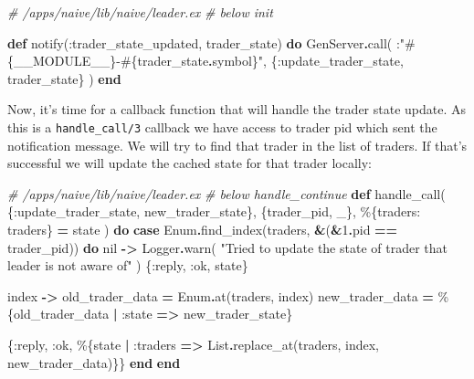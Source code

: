 \documentclass[
]{book}
\newenvironment{Shaded}{\begin{snugshade}}{\end{snugshade}}
\newcommand{\CommentTok}[1]{\textcolor[rgb]{0.56,0.35,0.01}{\textit{#1}}}
\newcommand{\ConstantTok}[1]{\textcolor[rgb]{0.00,0.00,0.00}{#1}}
\newcommand{\DecValTok}[1]{\textcolor[rgb]{0.00,0.00,0.81}{#1}}
\newcommand{\KeywordTok}[1]{\textcolor[rgb]{0.13,0.29,0.53}{\textbf{#1}}}
\newcommand{\NormalTok}[1]{#1}
\newcommand{\OperatorTok}[1]{\textcolor[rgb]{0.81,0.36,0.00}{\textbf{#1}}}
\newcommand{\OtherTok}[1]{\textcolor[rgb]{0.56,0.35,0.01}{#1}}
\newcommand{\StringTok}[1]{\textcolor[rgb]{0.31,0.60,0.02}{#1}}
\newcommand{\VariableTok}[1]{\textcolor[rgb]{0.00,0.00,0.00}{#1}}
\begin{document}
\begin{Shaded}
\begin{Highlighting}[]
  \CommentTok{\# /apps/naive/lib/naive/leader.ex}
  \CommentTok{\# below init}

  \KeywordTok{def}\NormalTok{ notify(}\VariableTok{:trader\_state\_updated}\NormalTok{, trader\_state) }\KeywordTok{do}
    \ConstantTok{GenServer}\OperatorTok{.}\NormalTok{call(}
\NormalTok{      :}\StringTok{"}\OtherTok{\#\{}\ConstantTok{\_\_MODULE\_\_}\OtherTok{\}}\StringTok{{-}}\OtherTok{\#\{}\NormalTok{trader\_state}\OperatorTok{.}\NormalTok{symbol}\OtherTok{\}}\StringTok{"}\NormalTok{,}
\NormalTok{      \{}\VariableTok{:update\_trader\_state}\NormalTok{, trader\_state\}}
\NormalTok{    )}
  \KeywordTok{end}
\end{Highlighting}
\end{Shaded}

Now, it's time for a callback function that will handle the trader state update. As this is a \texttt{handle\_call/3} callback we have access to trader pid which sent the notification message. We will try to find that trader in the list of traders. If that's successful we will update the cached state for that
trader locally:

\begin{Shaded}
\begin{Highlighting}[]
  \CommentTok{\# /apps/naive/lib/naive/leader.ex}
  \CommentTok{\# below handle\_continue}
  \KeywordTok{def}\NormalTok{ handle\_call(}
\NormalTok{    \{}\VariableTok{:update\_trader\_state}\NormalTok{, new\_trader\_state\},}
\NormalTok{    \{trader\_pid, \_\},}
\NormalTok{    \%\{}\VariableTok{traders:}\NormalTok{ traders\} }\OperatorTok{=}\NormalTok{ state}
\NormalTok{  ) }\KeywordTok{do}
    \KeywordTok{case} \ConstantTok{Enum}\OperatorTok{.}\NormalTok{find\_index(traders, }\OperatorTok{\&}\NormalTok{(}\OperatorTok{\&}\DecValTok{1}\OperatorTok{.}\NormalTok{pid }\OperatorTok{==}\NormalTok{ trader\_pid)) }\KeywordTok{do}
      \ConstantTok{nil} \OperatorTok{{-}\textgreater{}}
        \ConstantTok{Logger}\OperatorTok{.}\NormalTok{warn(}
          \StringTok{"Tried to update the state of trader that leader is not aware of"}
\NormalTok{        )}
\NormalTok{        \{}\VariableTok{:reply}\NormalTok{, }\VariableTok{:ok}\NormalTok{, state\}}
      
\NormalTok{      index }\OperatorTok{{-}\textgreater{}}
\NormalTok{        old\_trader\_data }\OperatorTok{=} \ConstantTok{Enum}\OperatorTok{.}\NormalTok{at(traders, index)}
\NormalTok{        new\_trader\_data }\OperatorTok{=}\NormalTok{ \%\{old\_trader\_data }\OperatorTok{|} \VariableTok{:state} \OperatorTok{=\textgreater{}}\NormalTok{ new\_trader\_state\}}

\NormalTok{        \{}\VariableTok{:reply}\NormalTok{, }\VariableTok{:ok}\NormalTok{, \%\{state }\OperatorTok{|} \VariableTok{:traders} \OperatorTok{=\textgreater{}}
          \ConstantTok{List}\OperatorTok{.}\NormalTok{replace\_at(traders, index, new\_trader\_data)\}\}}
    \KeywordTok{end}
  \KeywordTok{end}
\end{Highlighting}
\end{Shaded}
\end{document}
